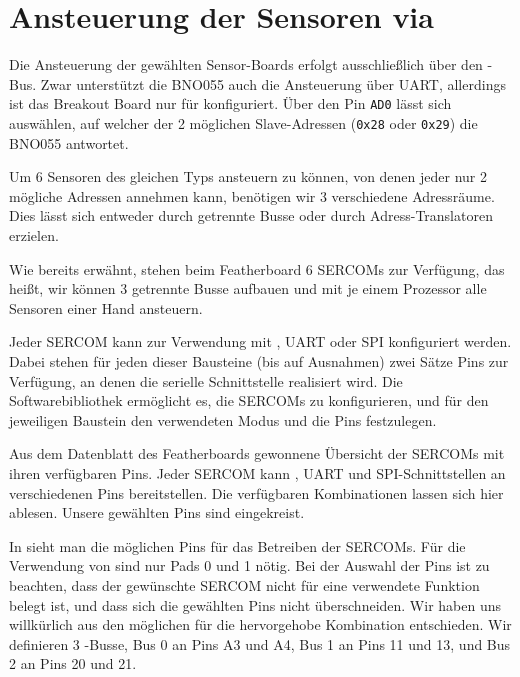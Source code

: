 
\section{Ansteuerung der Sensoren via \iic} 

Die Ansteuerung der gewählten Sensor-Boards erfolgt ausschließlich über den
\iic-Bus. Zwar unterstützt die BNO055 auch die Ansteuerung über UART,
allerdings ist das Break\-out Board nur für \iic konfiguriert. Über den Pin
\texttt{AD0} lässt sich auswählen, auf welcher der 2 möglichen Slave-Adressen
(\texttt{0x28} oder \texttt{0x29}) die BNO055 antwortet.

Um 6 Sensoren des gleichen Typs ansteuern zu können, von denen jeder nur 2
mögliche Adressen annehmen kann, benötigen wir 3 verschiedene Adressräume. Dies
lässt sich entweder durch getrennte Busse oder durch Adress-Translatoren
erzielen.

Wie bereits erwähnt, stehen beim Featherboard 6 SERCOMs zur Verfügung, das
heißt, wir können 3 getrennte Busse aufbauen und mit je einem Prozessor alle
Sensoren einer Hand ansteuern.

Jeder SERCOM kann zur Verwendung mit \iic, UART oder SPI konfiguriert werden.
Dabei stehen für jeden dieser Bausteine (bis auf Ausnahmen) zwei Sätze Pins zur
Verfügung, an denen die serielle Schnittstelle realisiert wird. Die
Softwarebibliothek ermöglicht es, die SERCOMs zu konfigurieren, und für den
jeweiligen Baustein den verwendeten Modus und die Pins festzulegen.

\begin{table}
    \centering
    
    \caption[SERCOM Pins am Featherboard]{Aus dem Datenblatt des Featherboards
    gewonnene Übersicht der SERCOMs mit ihren verfügbaren Pins. Jeder SERCOM
    kann \iic, UART und SPI-Schnittstellen an verschiedenen Pins bereitstellen.
    Die verfügbaren Kombinationen lassen sich hier ablesen. Unsere gewählten
    Pins sind eingekreist.}
\end{table}

In  sieht man die möglichen Pins für das Betreiben der SERCOMs.
Für die Verwendung von \iic sind nur Pads 0 und 1 nötig. Bei der Auswahl der
Pins ist zu beachten, dass der gewünschte SERCOM nicht für eine verwendete
Funktion belegt ist, und dass sich die gewählten Pins nicht überschneiden. Wir
haben uns willkürlich aus den möglichen für die hervorgehobe Kombination
entschieden. Wir definieren 3 \iic-Busse, Bus 0 an Pins A3 und A4, Bus 1 an
Pins 11 und 13, und Bus 2 an Pins 20 und 21.

